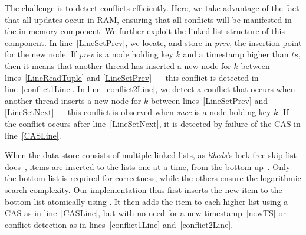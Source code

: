 The challenge is to detect conflicts efficiently.
Here, we take advantage of the fact that all updates occur in RAM, ensuring that all conflicts will be manifested in the in-memory component.
We further exploit the linked list structure of this component.
In line~\ref{LineSetPrev}, we locate, and store in \emph{prev}, the insertion point for the new node.
%
If \emph{prev} is a node holding key $k$ and a timestamp higher than $ts$,
then it means that another thread has inserted a new node for $k$ between lines~\ref{LineReadTuple} and \ref{LineSetPrev} ---
this conflict is detected in line~\ref{conflict1Line}.
%
In line~\ref{conflict2Line}, we detect a conflict that occurs when
another thread inserts a new node for $k$ between lines~\ref{LineSetPrev} and
\ref{LineSetNext} --- this conflict is observed when \emph{succ} is a node
holding key $k$.
%
If the conflict occurs after line~\ref{LineSetNext}, it is detected by failure of the CAS in line~\ref{CASLine}.




When the data store consists of multiple linked lists, as
\emph{libcds}'s lock-free skip-list does~\cite{libcds}, items are inserted to
the lists one at a time, from the bottom up~\cite{Herlihy2008}.
Only the bottom  list is required for correctness, while the others ensure the
logarithmic search complexity. Our implementation thus
first inserts the new item
to the bottom list atomically using . It then adds the item to each higher list using a CAS as
in line~\ref{CASLine}, but with no need for a new timestamp~\ref{newTS} or
conflict detection as in lines~\ref{conflict1Line} and~\ref{conflict2Line}.

